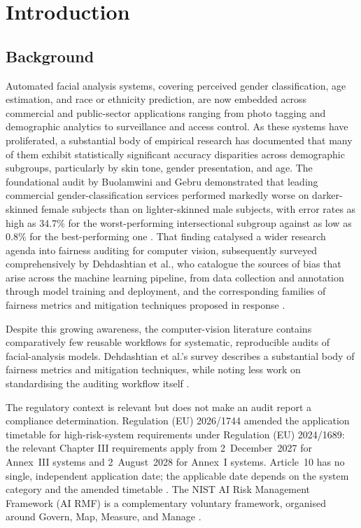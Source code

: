 \chapter{Introduction}
\label{chap:intro}

\section{Background}

Automated facial analysis systems, covering perceived gender classification, age estimation, and race or ethnicity prediction, are now embedded across commercial and public-sector applications ranging from photo tagging and demographic analytics to surveillance and access control. As these systems have proliferated, a substantial body of empirical research has documented that many of them exhibit statistically significant accuracy disparities across demographic subgroups, particularly by skin tone, gender presentation, and age. The foundational audit by Buolamwini and Gebru demonstrated that leading commercial gender-classification services performed markedly worse on darker-skinned female subjects than on lighter-skinned male subjects, with error rates as high as 34.7\% for the worst-performing intersectional subgroup against as low as 0.8\% for the best-performing one \cite{buolamwini2018gendershades}. That finding catalysed a wider research agenda into fairness auditing for computer vision, subsequently surveyed comprehensively by Dehdashtian et al., who catalogue the sources of bias that arise across the machine learning pipeline, from data collection and annotation through model training and deployment, and the corresponding families of fairness metrics and mitigation techniques proposed in response \cite{dehdashtian2024survey}.

Despite this growing awareness, the computer-vision literature contains comparatively few reusable workflows for systematic, reproducible audits of facial-analysis models. Dehdashtian et al.'s survey describes a substantial body of fairness metrics and mitigation techniques, while noting less work on standardising the auditing workflow itself \cite{dehdashtian2024survey}.

The regulatory context is relevant but does not make an audit report a compliance determination. Regulation (EU) 2026/1744 amended the application timetable for high-risk-system requirements under Regulation (EU) 2024/1689: the relevant Chapter III requirements apply from 2~December~2027 for Annex~III systems and 2~August~2028 for Annex~I systems. Article~10 has no single, independent application date; the applicable date depends on the system category and the amended timetable \cite{euaiact2024,euomnibus2026}. The NIST AI Risk Management Framework (AI RMF) is a complementary voluntary framework, organised around Govern, Map, Measure, and Manage \cite{nist2023aiframework}.

